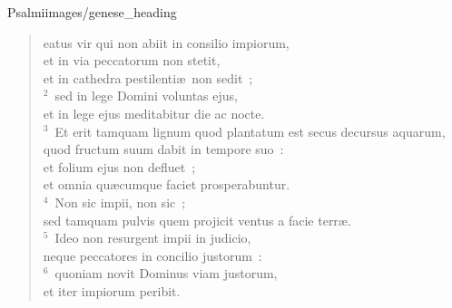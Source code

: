 {Psalmi}{images/genese_heading}

\bchapter[Psalm]
\begin{verse}
eatus vir qui non abiit in consilio impiorum,\\ et in via peccatorum non stetit,\\ et in cathedra pestilenti\ae\ non sedit~;\\
${}^{2}$~sed in lege Domini voluntas ejus,\\ et in lege ejus meditabitur die ac nocte.\\
${}^{3}$~Et erit tamquam lignum quod plantatum est secus decursus aquarum,\\ quod fructum suum dabit in tempore suo~:\\ et folium ejus non defluet~;\\ et omnia qu\ae cumque faciet prosperabuntur.\\
${}^{4}$~Non sic impii, non sic~;\\ sed tamquam pulvis quem projicit ventus a facie terr\ae .\\
${}^{5}$~Ideo non resurgent impii in judicio,\\ neque peccatores in concilio justorum~:\\
${}^{6}$~quoniam novit Dominus viam justorum,\\ et iter impiorum peribit.
\end{verse}


